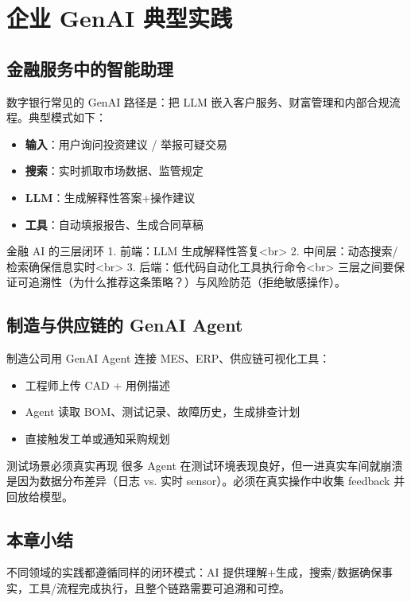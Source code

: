 \section{企业 GenAI 典型实践}

\subsection{金融服务中的智能助理}

数字银行常见的 GenAI 路径是：把 LLM 嵌入客户服务、财富管理和内部合规流程。典型模式如下：

\begin{itemize}
    \item \textbf{输入}：用户询问投资建议 / 举报可疑交易
    \item \textbf{搜索}：实时抓取市场数据、监管规定
    \item \textbf{LLM}：生成解释性答案+操作建议
    \item \textbf{工具}：自动填报报告、生成合同草稿
\end{itemize}

\begin{knowledgebox}{金融 AI 的三层闭环}
1. 前端：LLM 生成解释性答复<br>
2. 中间层：动态搜索/检索确保信息实时<br>
3. 后端：低代码自动化工具执行命令<br>
三层之间要保证可追溯性（为什么推荐这条策略？）与风险防范（拒绝敏感操作）。
\end{knowledgebox}

\subsection{制造与供应链的 GenAI Agent}

制造公司用 GenAI Agent 连接 MES、ERP、供应链可视化工具：

\begin{itemize}
    \item 工程师上传 CAD + 用例描述
    \item Agent 读取 BOM、测试记录、故障历史，生成排查计划
    \item 直接触发工单或通知采购规划
\end{itemize}

\begin{warningbox}{测试场景必须真实再现}
很多 Agent 在测试环境表现良好，但一进真实车间就崩溃是因为数据分布差异（日志 vs. 实时 sensor）。必须在真实操作中收集 feedback 并回放给模型。
\end{warningbox}

\subsection{本章小结}

不同领域的实践都遵循同样的闭环模式：AI 提供理解+生成，搜索/数据确保事实，工具/流程完成执行，且整个链路需要可追溯和可控。

